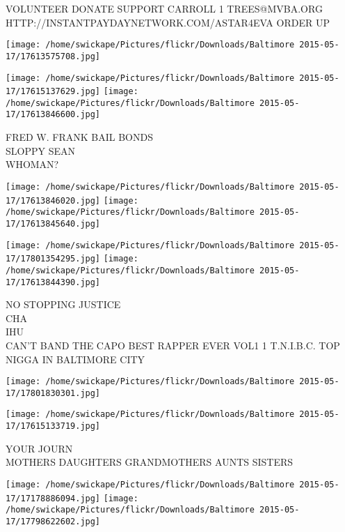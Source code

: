 \documentclass[10pt,letterpaper]{article}
\begin{document}
VOLUNTEER DONATE SUPPORT CARROLL 1 TREES@MVBA.ORG\\
HTTP://INSTANTPAYDAYNETWORK.COM/ASTAR4EVA ORDER UP\\
\pagebreak

\texttt{[image: /home/swickape/Pictures/flickr/Downloads/Baltimore 2015-05-17/17613575708.jpg]}

\vspace{0.25in}
\texttt{[image: /home/swickape/Pictures/flickr/Downloads/Baltimore 2015-05-17/17615137629.jpg]}
\texttt{[image: /home/swickape/Pictures/flickr/Downloads/Baltimore 2015-05-17/17613846600.jpg]}

FRED W. FRANK BAIL BONDS\\
SLOPPY SEAN\\
WHOMAN?\\
\pagebreak

\texttt{[image: /home/swickape/Pictures/flickr/Downloads/Baltimore 2015-05-17/17613846020.jpg]}
\texttt{[image: /home/swickape/Pictures/flickr/Downloads/Baltimore 2015-05-17/17613845640.jpg]}

\texttt{[image: /home/swickape/Pictures/flickr/Downloads/Baltimore 2015-05-17/17801354295.jpg]}
\texttt{[image: /home/swickape/Pictures/flickr/Downloads/Baltimore 2015-05-17/17613844390.jpg]}

NO STOPPING JUSTICE\\
CHA\\
IHU\\
CAN'T BAND THE CAPO BEST RAPPER EVER VOL1 1 T.N.I.B.C. TOP NIGGA IN BALTIMORE CITY\\
\pagebreak

\texttt{[image: /home/swickape/Pictures/flickr/Downloads/Baltimore 2015-05-17/17801830301.jpg]}

\vspace{0.25in}
\texttt{[image: /home/swickape/Pictures/flickr/Downloads/Baltimore 2015-05-17/17615133719.jpg]}

YOUR JOURN\\
MOTHERS DAUGHTERS GRANDMOTHERS AUNTS SISTERS\\
\pagebreak

\texttt{[image: /home/swickape/Pictures/flickr/Downloads/Baltimore 2015-05-17/17178886094.jpg]}
\texttt{[image: /home/swickape/Pictures/flickr/Downloads/Baltimore 2015-05-17/17798622602.jpg]}
\end{document}
